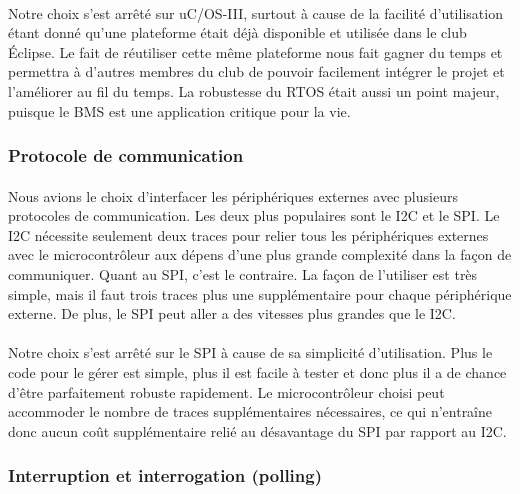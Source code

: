		\paragraph*{}
		Notre choix s’est arrêté sur uC/OS-III, surtout à cause de la facilité d’utilisation étant donné qu’une plateforme était déjà disponible et utilisée dans le club Éclipse. Le fait de réutiliser cette même plateforme nous fait gagner du temps et permettra à d’autres membres du club de pouvoir facilement intégrer le projet et l’améliorer au fil du temps. La robustesse du RTOS était aussi un point majeur, puisque le BMS est une application critique pour la vie.

	\subsubsection*{Protocole de communication}
		\paragraph*{}
		Nous avions le choix d’interfacer les périphériques externes avec plusieurs protocoles de communication. Les deux plus populaires sont le I2C et le SPI. Le I2C nécessite seulement deux traces pour relier tous les périphériques externes avec le microcontrôleur aux dépens d’une plus grande complexité dans la façon de communiquer. Quant au SPI, c’est le contraire. La façon de l’utiliser est très simple, mais il faut trois traces plus une supplémentaire pour chaque périphérique externe. De plus, le SPI peut aller a des vitesses plus grandes que le I2C.

		\paragraph*{}
		Notre choix s’est arrêté sur le SPI à cause de sa simplicité d’utilisation. Plus le code pour le gérer est simple, plus il est facile à tester et donc plus il a de chance d’être parfaitement robuste rapidement. Le microcontrôleur choisi peut accommoder le nombre de traces supplémentaires nécessaires, ce qui n’entraîne donc aucun coût supplémentaire relié au désavantage du SPI par rapport au I2C.

	\subsubsection*{Interruption et interrogation (polling)}
